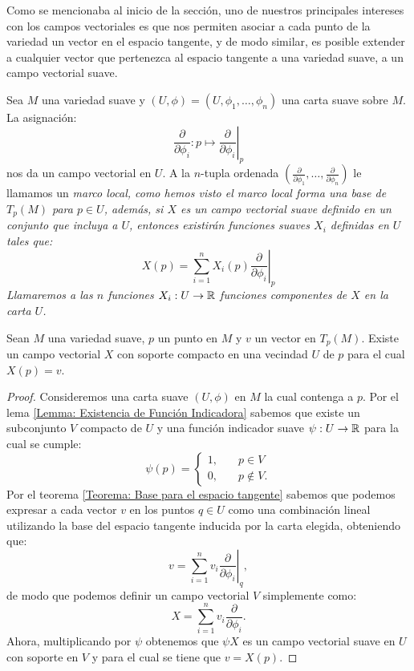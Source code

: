 Como se mencionaba al inicio de la sección, uno de nuestros principales intereses con los campos vectoriales es que nos permiten asociar a cada punto de la variedad un vector en el espacio tangente, y de modo similar, es posible extender a cualquier vector que pertenezca al espacio tangente a una variedad suave, a un campo vectorial suave.

\begin{example}\label{Ejemplo: Campo Vectorial en M}
	Sea $M$ una variedad suave y $(U,\phi)=(U,\phi_1, \dots,\phi_n)$ una carta suave sobre $M$. La asignación:
	\[
		\frac{\partial}{\partial \phi_i}: p \mapsto \left. \frac{\partial}{\partial \phi_i}\right|_{p}
	\]
	nos da un campo vectorial en $U$. A la $n$-tupla ordenada $(\frac{\partial}{\partial \phi_1}, \dots, \frac{\partial}{\partial \phi_n})$ le llamamos un \it{marco local}, como hemos visto el marco local forma una base de $T_p(M)$ para $p \in U$, además, si $X$ es un campo vectorial suave definido en un conjunto que incluya a $U$, entonces existirán funciones suaves $X_i$ definidas en $U$ tales que:
	\[
		X(p) = \sum_{i=1}^{n}X_i(p)\left.\frac{\partial}{\partial\phi_i} \right|_{p}
	\]
	Llamaremos a las $n$ funciones $X_i: U \to \mathbb{R}$ \it{funciones componentes de $X$} en la carta $U$.
\end{example}


\begin{lemma}\label{Lema: Existencia de Campo Vectorial Suave}
	Sean $M$ una variedad suave, $p$ un punto en $M$ y $v$ un vector en $T_p(M)$. Existe un campo vectorial $X$ con soporte compacto en una vecindad $U$ de $p$ para el cual $X(p) = v$.
\end{lemma}

\begin{proof}
	Consideremos una carta suave $(U,\phi)$ en $M$ la cual contenga a $p$. Por el lema \ref{Lemma: Existencia de Función Indicadora} sabemos que existe un subconjunto $V$ compacto de $U$ y una función indicador suave $\psi: U \to \mathbb{R}$ para la cual se cumple:
	\[
		\psi(p) = \begin{cases}
			1, \quad & p \in V     \\
			0, \quad & p \notin V.
		\end{cases}
	\]
	Por el teorema \ref{Teorema: Base para el espacio tangente} sabemos que podemos expresar a cada vector $v$ en los puntos $q \in U$ como una combinación lineal utilizando la base del espacio tangente inducida por la carta elegida, obteniendo que:
	\[
		v = \sum_{i=1}^{n} v_i
		\left. \frac{\partial}{\partial \phi_i} \right|_q,
	\]
	de modo que podemos definir un campo vectorial $V$ simplemente como:
	\[
		X = \sum_{i=1}^n v_i \frac{\partial}{\partial \phi_i}.
	\]
	Ahora, multiplicando por $\psi$ obtenemos que $\psi X$ es un campo vectorial suave en $U$ con soporte en $V$ y para el cual se tiene que $v = X(p)$.
\end{proof}

